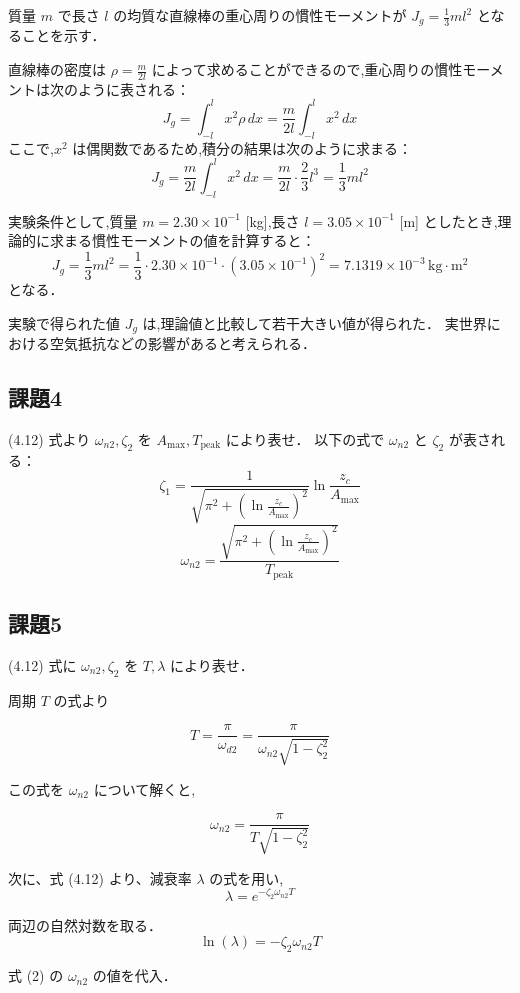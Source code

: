 質量 \(m\) で長さ \(l\) の均質な直線棒の重心周りの慣性モーメントが \(J_g = \frac{1}{3}ml^2\) となることを示す．

直線棒の密度は \(\rho = \frac{m}{2l}\) によって求めることができるので,重心周りの慣性モーメントは次のように表される：
\[
  J_g = \int_{-l}^{l} x^2 \rho \, dx = \frac{m}{2l} \int_{-l}^{l} x^2 \, dx
\]
ここで,\(x^2\) は偶関数であるため,積分の結果は次のように求まる：
\[
  J_g = \frac{m}{2l} \int_{-l}^{l} x^2 \, dx = \frac{m}{2l} \cdot \frac{2}{3} l^3 = \frac{1}{3} ml^2
\]

実験条件として,質量 \(m = 2.30 \times 10^{-1}\) [kg],長さ \(l = 3.05 \times 10^{-1}\) [m] としたとき,理論的に求まる慣性モーメントの値を計算すると：
\[
  J_g = \frac{1}{3}ml^2 = \frac{1}{3} \cdot 2.30 \times 10^{-1} \cdot (3.05 \times 10^{-1})^2 = 7.1319 \times 10^{-3} \, \text{kg} \cdot \text{m}^2
\]
となる．

実験で得られた値 \(J_g\) は,理論値と比較して若干大きい値が得られた．
実世界における空気抵抗などの影響があると考えられる．

\subsection*{課題4}
(4.12) 式より $\omega_{n2}, \zeta_2$ を $A_{\max}, T_{\text{peak}}$ により表せ．
以下の式で $\omega_{n2}$ と $\zeta_2$ が表される：
\[
  \zeta_1 = \frac{1}{\sqrt{\pi^2 + \left( \ln \frac{z_c}{A_{\max}} \right)^2}} \ln \frac{z_c}{A_{\max}}
\]
\[
  \omega_{n2} = \frac{\sqrt{\pi^2 + \left( \ln \frac{z_c}{A_{\max}} \right)^2}}{T_{\text{peak}}}
\]

\subsection*{課題5}
(4.12) 式に $\omega_{n2}, \zeta_2$ を $T, \lambda$ により表せ．

周期 \(T\) の式より

\[
  T = \frac{\pi}{\omega_{d2}} = \frac{\pi}{\omega_{n2} \sqrt{1 - \zeta_2^2}} \tag{1}
\]

この式を \(\omega_{n2}\) について解くと,

\[
  \omega_{n2} = \frac{\pi}{T \sqrt{1 - \zeta_2^2}} \tag{2}
\]

次に、式 (4.12) より、減衰率 \(\lambda\) の式を用い,
\[
  \lambda = e^{-\zeta_2 \omega_{n2} T} \tag{3}
\]

両辺の自然対数を取る．
\[
  \ln(\lambda) = -\zeta_2 \omega_{n2} T \tag{4}
\]

式 (2) の \(\omega_{n2}\) の値を代入．


